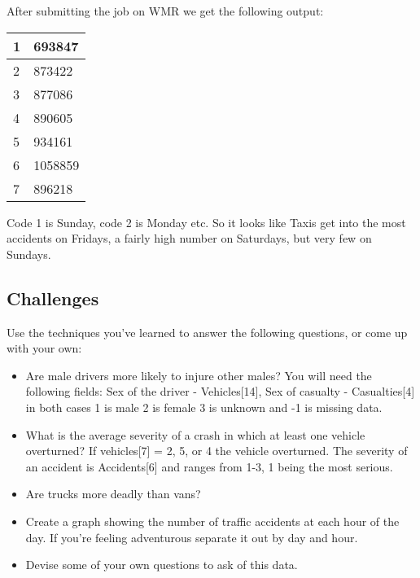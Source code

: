 \documentclass[letterpaper,10pt,openany,oneside]{sphinxmanual}
\begin{document}
After submitting the job on WMR we get the following output:

\begin{tabulary}{\linewidth}{|L|L|}
\hline

1
 & 
693847
\\\hline

2
 & 
873422
\\\hline

3
 & 
877086
\\\hline

4
 & 
890605
\\\hline

5
 & 
934161
\\\hline

6
 & 
1058859
\\\hline

7
 & 
896218
\\\hline
\end{tabulary}


Code 1 is Sunday, code 2 is Monday etc. So it looks like
Taxis get into the most accidents on Fridays, a fairly high
number on Saturdays, but very few on Sundays.


\subsection{Challenges}
\label{1-MulitipleFiles/Multiples:challenges}
Use the techniques you've learned to answer the following
questions, or come up with your own:
\begin{itemize}
\item {} 
Are male drivers more likely to injure other males? You
will need the following fields: Sex of the driver -
Vehicles{[}14{]}, Sex of casualty - Casualties{[}4{]} in both
cases 1 is male 2 is female 3 is unknown and -1 is
missing data.

\item {} 
What is the average severity of a crash in which at
least one vehicle overturned? If vehicles{[}7{]} = 2, 5, or
4 the vehicle overturned. The severity of an accident
is Accidents{[}6{]} and ranges from 1-3, 1 being the most
serious.

\item {} 
Are trucks more deadly than vans?

\item {} 
Create a graph showing the number of traffic accidents
at each hour of the day. If you're feeling adventurous
separate it out by day and hour.

\item {} 
Devise some of your own questions to ask of this data.

\end{itemize}



\renewcommand{\indexname}{Index}
\printindex
\end{document}
